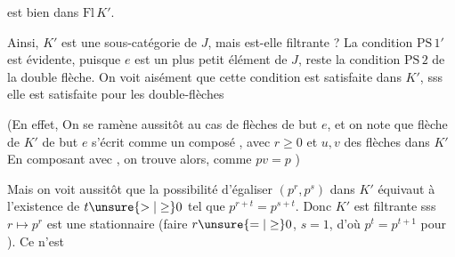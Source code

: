 est  bien dans $\mathrm{Fl}\,K'$.

Ainsi, $K'$ est une sous-catégorie de $J$, mais est-elle filtrante ? La condition $\mathrm{PS}\,1'$ est évidente, puisque $e$ est un plus petit élément de $J$, reste la condition $\mathrm{PS}\,2$ de la double flèche. On voit aisément que cette condition est satisfaite dans $K'$, sss elle est satisfaite pour les double-flèches

(En effet,  On se ramène aussitôt au cas de  flèches de but $e$, et on note que  flèche de $K'$ de but $e$ s'écrit comme un composé
, avec $r\geq0$ et $u,v$
des flèches dans $K'$  En composant
avec , on trouve alors, comme $pv=p$
\unsure{:} )

Mais on voit aussitôt que la possibilité d'égaliser $(p^r,p^s)$ dans $K'$ équivaut à l'existence de $t\unsure{>|\geq}0$ tel que $p^{r+t}=p^{s+t}$. Donc $K'$ est filtrante sss \deleted{\unsure{$\varphi$}} $r\longmapsto p^r$ est une  stationnaire (faire $r\unsure{=|\geq}0$, $s=1$, d'où $p^t=p^{t+1}$ pour ). Ce n'est
